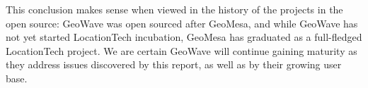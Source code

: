 This conclusion makes sense when viewed in the history of the projects in the open source: GeoWave was open sourced after GeoMesa, and while GeoWave has not yet started LocationTech incubation, GeoMesa has graduated as a full-fledged LocationTech project.
We are certain GeoWave will continue gaining maturity as they address issues discovered by this report, as well as by their growing user base.
